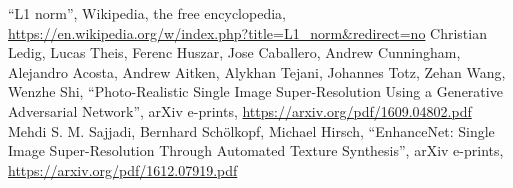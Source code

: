 \documentclass[conference]{IEEEtran}
\begin{document}
\begin{thebibliography}{30}
		 ``L1 norm'', Wikipedia, the free encyclopedia, \url{https://en.wikipedia.org/w/index.php?title=L1_norm&redirect=no}
		 Christian Ledig, Lucas Theis, Ferenc Huszar, Jose Caballero, Andrew Cunningham, Alejandro Acosta, Andrew Aitken, Alykhan Tejani, Johannes Totz, Zehan Wang, Wenzhe Shi, ``Photo-Realistic Single Image Super-Resolution Using a Generative Adversarial Network'', arXiv e-prints, \url{https://arxiv.org/pdf/1609.04802.pdf}
		 Mehdi S. M. Sajjadi, Bernhard Schölkopf, Michael Hirsch, ``EnhanceNet: Single Image Super-Resolution Through Automated Texture Synthesis'', arXiv e-prints, \url{https://arxiv.org/pdf/1612.07919.pdf}
	\end{thebibliography}
	
	
\end{document}
